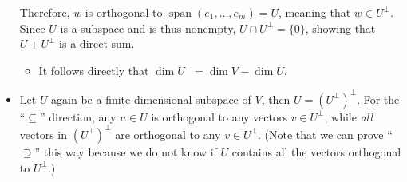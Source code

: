 \documentclass[11pt]{article}
\newcommand{\s}{\operatorname{span}}
\renewcommand{\d}{\dim}
\begin{document}
\begin{itemize}
    Therefore, $w$ is orthogonal to $\s(e_1,\dots,e_m) = U$, meaning that $w \in U^\perp$. Since $U$ is a subspace and is thus nonempty, $U \cap U^\perp = \{0\}$, showing that $U + U^\perp$ is a direct sum.
    \begin{itemize}
        \item It follows directly that $\d U^\perp = \d V - \d U$.
    \end{itemize}
    \item Let $U$ again be a finite-dimensional subspace of $V$, then $U=(U^\perp)^\perp$. For the ``$\subseteq$'' direction, any $u \in U$ is orthogonal to any vectors $v \in U^\perp$, while \emph{all} vectors in $(U^\perp)^\perp$ are orthogonal to any $v \in U^\perp$. (Note that we can prove ``$\supseteq$'' this way because we do not know if $U$ contains all the vectors orthogonal to $U^\perp$.)
    

\end{itemize}
\end{document}
